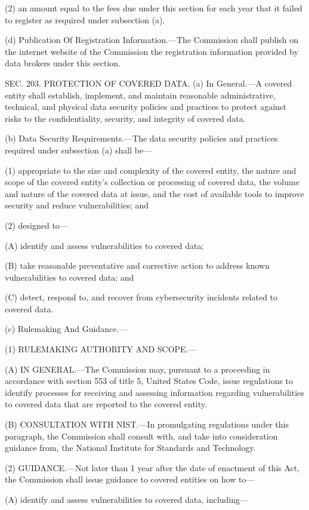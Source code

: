 (2) an amount equal to the fees due under this section for each year that it failed to register as required under subsection (a).

(d) Publication Of Registration Information.—The Commission shall publish on the internet website of the Commission the registration information provided by data brokers under this section.


SEC. 203. PROTECTION OF COVERED DATA.
(a) In General.—A covered entity shall establish, implement, and maintain reasonable administrative, technical, and physical data security policies and practices to protect against risks to the confidentiality, security, and integrity of covered data.

(b) Data Security Requirements.—The data security policies and practices required under subsection (a) shall be—

(1) appropriate to the size and complexity of the covered entity, the nature and scope of the covered entity’s collection or processing of covered data, the volume and nature of the covered data at issue, and the cost of available tools to improve security and reduce vulnerabilities; and

(2) designed to—

(A) identify and assess vulnerabilities to covered data;

(B) take reasonable preventative and corrective action to address known vulnerabilities to covered data; and

(C) detect, respond to, and recover from cybersecurity incidents related to covered data.

(c) Rulemaking And Guidance.—

(1) RULEMAKING AUTHORITY AND SCOPE.—

(A) IN GENERAL.—The Commission may, pursuant to a proceeding in accordance with section 553 of title 5, United States Code, issue regulations to identify processes for receiving and assessing information regarding vulnerabilities to covered data that are reported to the covered entity.

(B) CONSULTATION WITH NIST.—In promulgating regulations under this paragraph, the Commission shall consult with, and take into consideration guidance from, the National Institute for Standards and Technology.

(2) GUIDANCE.—Not later than 1 year after the date of enactment of this Act, the Commission shall issue guidance to covered entities on how to—

(A) identify and assess vulnerabilities to covered data, including—

